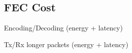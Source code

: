 \subsection{FEC Cost}

\begin{description}
\item Encoding/Decoding (energy + latency)
\item Tx/Rx longer packets (energy + latency)
\end{description}

